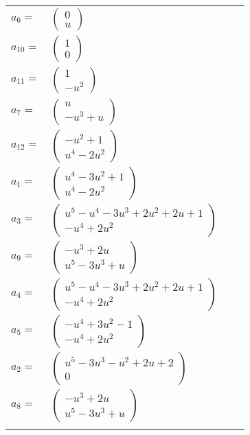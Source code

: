 \documentclass[1p]{elsarticle_modified}
\theoremstyle{definition}
\begin{document}
\begin{tabular}{m{7pt} m{180pt} m{7pt} m{180pt} }
\flushright $a_{6}=$&$\begin{pmatrix}0\\u\end{pmatrix}$ \\
\flushright $a_{10}=$&$\begin{pmatrix}1\\0\end{pmatrix}$ \\
\flushright $a_{11}=$&$\begin{pmatrix}1\\- u^2\end{pmatrix}$ \\
\flushright $a_{7}=$&$\begin{pmatrix}u\\- u^3+u\end{pmatrix}$ \\
\flushright $a_{12}=$&$\begin{pmatrix}- u^2+1\\u^4-2 u^2\end{pmatrix}$ \\
\flushright $a_{1}=$&$\begin{pmatrix}u^4-3 u^2+1\\u^4-2 u^2\end{pmatrix}$ \\
\flushright $a_{3}=$&$\begin{pmatrix}u^5- u^4-3 u^3+2 u^2+2 u+1\\- u^4+2 u^2\end{pmatrix}$ \\
\flushright $a_{9}=$&$\begin{pmatrix}- u^3+2 u\\u^5-3 u^3+u\end{pmatrix}$ \\
\flushright $a_{4}=$&$\begin{pmatrix}u^5- u^4-3 u^3+2 u^2+2 u+1\\- u^4+2 u^2\end{pmatrix}$ \\
\flushright $a_{5}=$&$\begin{pmatrix}- u^4+3 u^2-1\\- u^4+2 u^2\end{pmatrix}$ \\
\flushright $a_{2}=$&$\begin{pmatrix}u^5-3 u^3- u^2+2 u+2\\0\end{pmatrix}$ \\
\flushright $a_{8}=$&$\begin{pmatrix}- u^3+2 u\\u^5-3 u^3+u\end{pmatrix}$\\&\end{tabular}
\end{document}
